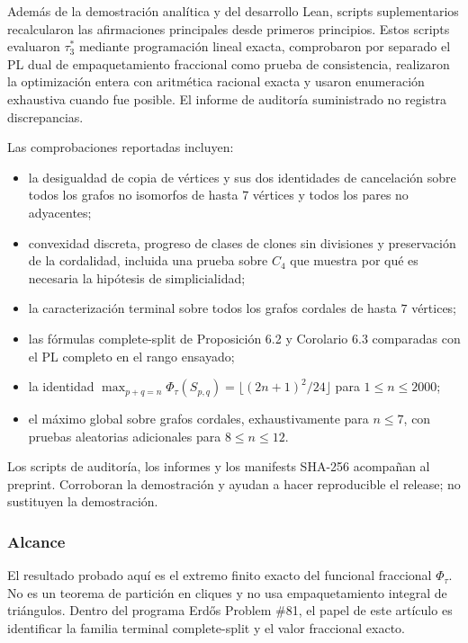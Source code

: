\documentclass[
  spanish,
  11pt,
  a4paper,
]{article}
\providecommand{\tightlist}{%
  \setlength{\itemsep}{0pt}\setlength{\parskip}{0pt}}
\begin{document}
Además de la demostración analítica y del desarrollo Lean, scripts suplementarios recalcularon las afirmaciones principales desde primeros principios. Estos scripts evaluaron \(\tau_3^*\) mediante programación lineal exacta, comprobaron por separado el PL dual de empaquetamiento fraccional como prueba de consistencia, realizaron la optimización entera con aritmética racional exacta y usaron enumeración exhaustiva cuando fue posible. El informe de auditoría suministrado no registra discrepancias.

Las comprobaciones reportadas incluyen:

\begin{itemize}
\tightlist
\item
  la desigualdad de copia de vértices y sus dos identidades de cancelación sobre todos los grafos no isomorfos de hasta \(7\) vértices y todos los pares no adyacentes;
\item
  convexidad discreta, progreso de clases de clones sin divisiones y preservación de la cordalidad, incluida una prueba sobre \(C_4\) que muestra por qué es necesaria la hipótesis de simplicialidad;
\item
  la caracterización terminal sobre todos los grafos cordales de hasta \(7\) vértices;
\item
  las fórmulas complete-split de Proposición 6.2 y Corolario 6.3 comparadas con el PL completo en el rango ensayado;
\item
  la identidad \(\max_{p+q=n}\Phi_\tau(S_{p,q})=\lfloor(2n+1)^2/24\rfloor\) para \(1\le n\le2000\);
\item
  el máximo global sobre grafos cordales, exhaustivamente para \(n\le7\), con pruebas aleatorias adicionales para \(8\le n\le12\).
\end{itemize}

Los scripts de auditoría, los informes y los manifests SHA-256 acompañan al preprint. Corroboran la demostración y ayudan a hacer reproducible el release; no sustituyen la demostración.

\subsubsection{Alcance}\label{alcance}

El resultado probado aquí es el extremo finito exacto del funcional fraccional \(\Phi_\tau\). No es un teorema de partición en cliques y no usa empaquetamiento integral de triángulos. Dentro del programa Erdős Problem \#81, el papel de este artículo es identificar la familia terminal complete-split y el valor fraccional exacto.
\end{document}
